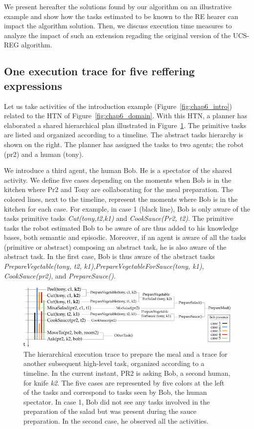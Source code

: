 We present hereafter the solutions found by our algorithm on an illustrative example and show how the tasks estimated to be known to the RE hearer can impact the algorithm solution. Then, we discuss execution time measures to analyze the impact of such an extension regading the original version of the UCS-REG algorithm.

\subsection{One execution trace for five reffering expressions}

Let us take activities of the introduction example (Figure~\ref{fig:chap6_intro}) related to the HTN of Figure~\ref{fig:chap6_domain}. With this HTN, a planner has elaborated a shared hierarchical plan illustrated in Figure~\ref{fig:chap6_meal_plan}. The primitive tasks are listed and organized according to a timeline. The abstract tasks hierarchy is shown on the right. The planner has assigned the tasks to two agents; the robot (pr2) and a human (tony).

We introduce a third agent, the human Bob. He is a spectator of the shared activity. We define five cases depending on the moments when Bob is in the kitchen where Pr2 and Tony are collaborating for the meal preparation. The colored lines, next to the timeline, represent the moments where Bob is in the kitchen for each case. For example, in case 1 (black line), Bob is only aware of the tasks primitive tasks \textit{Cut(tony,t2,k1)} and \textit{CookSauce(Pr2, t2)}. The primitive tasks the robot estimated Bob to be aware of are thus added to his knowledge bases, both semantic and episodic. Moreover, if an agent is aware of all the tasks (primitive or abstract) composing an abstract task, he is also aware of the abstract task. In the first case, Bob is thus aware of the abstract tasks \textit{PrepareVegetable(tony, t2, k1)},\textit{PrepareVegetableForSauce(tony, k1)}, \textit{CookSauce(pr2)}, and \textit{PrepareSauce()}.

\begin{figure}[h!]
\centering
\includegraphics[width=\textwidth]{figures/chapter6/prepare_meal_plan.png}
\caption{\label{fig:chap6_meal_plan} The hierarchical execution trace to prepare the meal and a trace for another subsequent high-level task, organized according to a timeline. In the current instant, PR2 is asking Bob, a second human, for knife \textit{k2}. The five cases are represented by five colors at the left of the tasks and correspond to tasks seen by Bob, the human spectator. In case 1, Bob did not see any tasks involved in the preparation of the salad but was present during the sauce preparation. In the second case, he observed all the activities.}
\end{figure}

